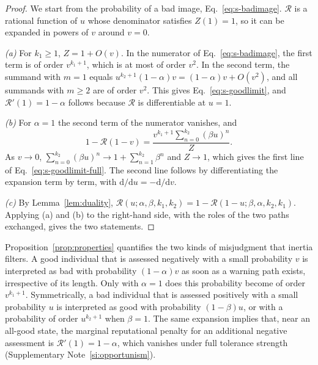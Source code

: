 \documentclass[10pt]{wlscirep}
\newcommand{\Rmap}{\mathscr{R}}            %
\newcommand{\dd}{\mathrm{d}}
\theoremstyle{plain}
\theoremstyle{remark}
\begin{document}
\begin{proof}
We start from the probability of a bad image, Eq.~\eqref{eq:s-badimage}. $\Rmap$ is a rational function of $u$ whose denominator satisfies $Z(1)=1$, so it can be expanded in powers of $v$ around $v=0$.

\textit{(a)} For $k_1\geq1$, $Z=1+O(v)$. In the numerator of Eq.~\eqref{eq:s-badimage}, the first term is of order $v^{k_1+1}$, which is at most of order $v^2$. In the second term, the summand with $m=1$ equals $u^{k_2+1}(1-\alpha)v=(1-\alpha)v+O(v^2)$, and all summands with $m\geq2$ are of order $v^2$. This gives Eq.~\eqref{eq:s-goodlimit}, and $\Rmap'(1)=1-\alpha$ follows because $\Rmap$ is differentiable at $u=1$.

\textit{(b)} For $\alpha=1$ the second term of the numerator vanishes, and
\begin{equation}
1-\Rmap(1-v)=\frac{v^{k_1+1}\sum_{n=0}^{k_2}(\beta u)^n}{Z}.
\label{eq:s-fulltolerance}
\end{equation}
As $v\to0$, $\sum_{n=0}^{k_2}(\beta u)^n\to1+\sum_{n=1}^{k_2}\beta^n$ and $Z\to1$, which gives the first line of Eq.~\eqref{eq:s-goodlimit-full}. The second line follows by differentiating the expansion term by term, with $\dd/\dd u=-\dd/\dd v$.

\textit{(c)} By Lemma~\ref{lem:duality}, $\Rmap(u;\alpha,\beta,k_1,k_2)=1-\Rmap(1-u;\beta,\alpha,k_2,k_1)$. Applying (a) and (b) to the right-hand side, with the roles of the two paths exchanged, gives the two statements.
\end{proof}

Proposition~\ref{prop:properties} quantifies the two kinds of misjudgment that inertia filters. A good individual that is assessed negatively with a small probability $v$ is interpreted as bad with probability $(1-\alpha)v$ as soon as a warning path exists, irrespective of its length. Only with $\alpha=1$ does this probability become of order $v^{k_1+1}$. Symmetrically, a bad individual that is assessed positively with a small probability $u$ is interpreted as good with probability $(1-\beta)u$, or with a probability of order $u^{k_2+1}$ when $\beta=1$. The same expansion implies that, near an all-good state, the marginal reputational penalty for an additional negative assessment is $\Rmap'(1)=1-\alpha$, which vanishes under full tolerance strength (Supplementary Note~\ref{si:opportunism}).
\end{document}
